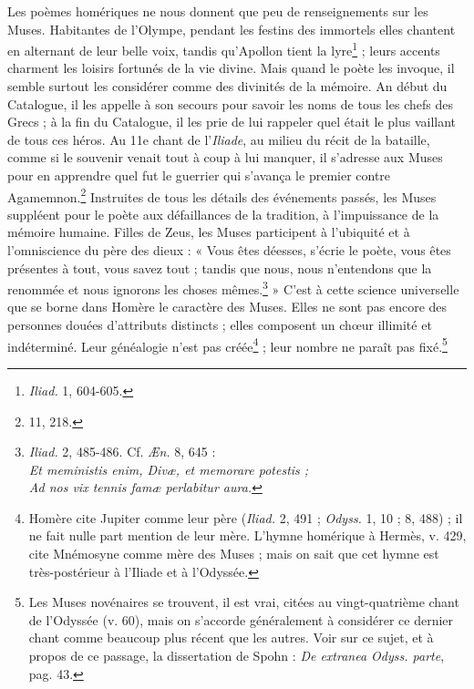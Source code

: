 \documentclass[a4paper, 11pt, oneside, polutonikogreek, french]{article}
\begin{document}
Les poèmes homériques ne nous donnent que peu de renseignements sur les Muses. Habitantes de l'Olympe, pendant les festins des immortels elles chantent en alternant de leur belle voix, tandis qu'Apollon tient la lyre\footnote{\emph{Iliad.} 1, 604-605.} ; leurs accents charment les loisirs fortunés de la vie divine. Mais quand le poète les invoque, il semble surtout les considérer comme des divinités de la mémoire. An début du Catalogue, il les appelle à son secours pour savoir les noms de tous les chefs des Grecs ; à la fin du Catalogue, il les prie de lui rappeler quel était le plus vaillant de tous ces héros. Au 11e chant de l'\emph{Iliade}, au milieu du récit de la bataille, comme si le souvenir venait tout à coup à lui manquer, il s'adresse aux Muses pour en apprendre quel fut le guerrier qui s'avança le premier contre Agamemnon.\footnote{11, 218.} Instruites de tous les détails des événements passés, les Muses suppléent pour le poète aux défaillances de la tradition, à l'impuissance de la mémoire humaine. Filles de Zeus, les Muses participent à l'ubiquité et à l'omniscience du père des dieux : « Vous êtes déesses, s'écrie le poète, vous êtes présentes à tout, vous savez tout ; tandis que nous, nous n'entendons que la renommée et nous ignorons les choses mêmes.\footnote{\emph{Iliad.} 2, 485-486. Cf. \emph{Æn.} 8, 645 :\\\hspace*{5mm}\emph{Et meministis enim, Divæ, et memorare potestis ;}\\\hspace*{5mm}\emph{Ad nos vix tennis famæ perlabitur aura.}} » C'est à cette science universelle que se borne dans Homère le caractère des Muses. Elles ne sont pas encore des personnes douées d'attributs distincts ; elles composent un chœur illimité et indéterminé. Leur généalogie n'est pas créée\footnote{Homère cite Jupiter comme leur père (\emph{Iliad.} 2, 491 ; \emph{Odyss.} 1, 10 ; 8, 488) ; il ne fait nulle part mention de leur mère. L'hymne homérique à Hermès, v. 429, cite Mnémosyne comme mère des Muses ; mais on sait que cet hymne est très-postérieur à l'Iliade et à l'Odyssée.} ; leur nombre ne paraît pas fixé.\footnote{Les Muses novénaires se trouvent, il est vrai, citées au vingt-quatrième chant de l'Odyssée (v. 60), mais on s'accorde généralement à considérer ce dernier chant comme beaucoup plus récent que les autres. Voir sur ce sujet, et à propos de ce passage, la dissertation de Spohn : \emph{De extranea Odyss. parte}, pag. 43.}
\end{document}
